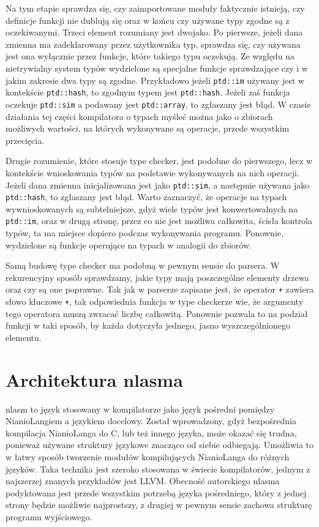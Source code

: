 \documentclass[licencjacka]{pracamgr}
\begin{document}
Na tym etapie sprawdza się, czy zaimportowane moduły faktycznie istnieją, czy definicje funkcji nie dublują się oraz w końcu czy używane typy zgodne
są z oczekiwanymi. Trzeci element rozumiany jest dwojako. Po pierwsze, jeżeli dana zmienna ma zadeklarowany przez użytkownika typ, sprawdza się, czy
używana jest ona wyłącznie przez funkcje, które takiego typu oczekują.  Ze względu na nietrywialny system typów wydzielone są specjalne funkcje
sprawdzające czy i w jakim zakresie dwa typy są zgodne. Przykładowo jeżeli \texttt{ptd::im} używany jest w kontekście \texttt{ptd::hash}, to zgodnym typem jest
\texttt{ptd::hash}. Jeżeli zaś funkcja oczekuje \texttt{ptd::sim} a podawany jest \texttt{ptd::array}, to zgłaszany jest błąd. W czasie działania tej części kompilatora o typach myśleć można
jako o zbiorach możliwych wartości, na których wykonywane są operacje, przede wszystkim przecięcia.

Drugie rozumienie, które stosuje type checker, jest podobne do pierwszego, lecz w kontekście wnioskowania typów na podstawie wykonywanych na nich
operacji. Jeżeli dana zmienna inicjalizowana jest jako \texttt{ptd::sim}, a następnie używana jako \texttt{ptd::hash}, to zgłaszany jest błąd. Warto zaznaczyć,
że operacje na typach wywnioskowanych są subtelniejsze, gdyż wiele typów jest konwertowalnych na \texttt{ptd::im}, oraz w drugą stronę, przez co nie jest
możliwa całkowita, ścisła kontrola typów, ta ma miejsce dopiero podczas wykonywania programu. Ponownie, wydzielone są funkcje operujące na typach w analogii do zbiorów.

Samą budowę type checker ma podobną w pewnym sensie do parsera. W rekurencyjny sposób sprawdzamy, jakie typy mają poszczególne elementy drzewa oraz
czy są one poprawne. Tak jak w parserze zapisane jest, że operator \texttt{+} zawiera słowo kluczowe \texttt{+}, tak odpowiednia funkcja w type
checkerze wie, że argumenty tego operatora muszą zwracać liczbę całkowitą. Ponownie pozwala to na podział funkcji w taki sposób, by każda
dotyczyła jednego, jasno wyszczególnionego elementu.
\section{Architektura nlasma}
nlasm to język stosowany w kompilatorze jako język pośredni pomiędzy NianioLangiem a językiem docelowy.
Został wprowadzony, gdyż bezpośrednia kompilacja NianioLanga do C, lub
też innego języka, może okazać się trudna, ponieważ używane struktury językowe znacząco od siebie odbiegają. Umożliwia to w łatwy sposób tworzenie
modułów kompilujących NianioLanga do różnych języków. Taka technika jest szeroko stosowana w świecie kompilatorów, jednym z najszerzej znanych
przykładów jest LLVM. Obecność autorskiego nlasma podyktowana jest przede wszystkim potrzebą języka pośredniego, który z jednej strony będzie możliwie
najprostszy, z drugiej w pewnym sensie zachowa strukturę programu wyjściowego.
\end{document}
